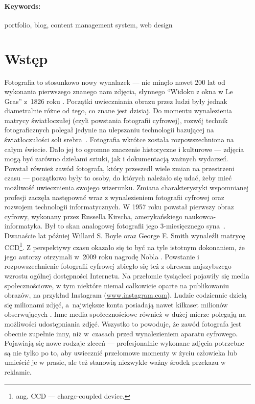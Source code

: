 \documentclass[a4paper, 12pt, twoside]{article}
\numberwithin{figure}{section}
\begin{document}
\begin{sloppypar}
\paragraph*{Keywords:}
portfolio, blog, content management system, web design

\newpage
\tableofcontents

\newpage


\section{Wstęp}

Fotografia to stosunkowo nowy wynalazek --- nie minęło nawet 200 lat od wykonania pierwszego znanego nam zdjęcia, słynnego ``Widoku z okna w Le Gras'' z~1826 roku \cite{fotografia}. Początki uwieczniania obrazu przez ludzi były jednak diametralnie różne od tego, co znane jest dzisiaj. Do momentu wynalezienia matrycy światłoczułej (czyli powstania fotografii cyfrowej), rozwój technik fotograficznych polegał jedynie na ulepszaniu technologii bazującej na światłoczułości soli srebra~\cite{fotografia}. Fotografia wkrótce została rozpowszechniona na całym świecie. Dało jej to ogromne znaczenie historyczne i kulturowe --- zdjęcia mogą być zarówno dziełami sztuki, jak i dokumentacją ważnych wydarzeń. Powstał również zawód fotografa, który przeszedł wiele zmian na przestrzeni czasu --- początkowo były to osoby, do których należało się udać, żeby mieć możliwość uwiecznienia swojego wizerunku. Zmiana charakterystyki wspomnianej profesji zaczęła następować wraz z wynalezieniem fotografii cyfrowej oraz rozwojem technologii informatycznych. W 1957 roku powstał pierwszy obraz cyfrowy, wykonany przez Russella Kirscha, amerykańskiego naukowca-informatyka. Był to skan analogowej fotografii jego 3-miesięcznego syna~\cite{firstdigitalphoto}. Dwanaście lat później Willard S. Boyle oraz George E. Smith wynaleźli matrycę CCD\footnote{ang. CCD --- charge-coupled device.}. Z perspektywy czasu okazało się to być na tyle istotnym dokonaniem, że jego autorzy otrzymali w~2009 roku nagrodę Nobla \cite{nobelfoto}. Powstanie i rozpowszechnienie fotografii cyfrowej zbiegło się też z okresem najszybszego wzrostu ogólnej dostępności Internetu. Na przełomie tysiącleci pojawiły się media społecznościowe, w tym niektóre niemal całkowicie oparte na publikowaniu obrazów, na przykład Instagram (\url{www.instagram.com}). Ludzie codziennie dzielą się milionami zdjęć, a~największe konta posiadają nawet kilkaset milionów obserwujących \cite{instagram}. Inne media społecznościowe również w dużej mierze polegają na możliwości udostępniania zdjęć. Wszystko to powoduje, że zawód fotografa jest obecnie zupełnie inny, niż w~czasach przed wynalezieniem aparatu cyfrowego. Pojawiają się nowe rodzaje zleceń --- profesjonalnie wykonane zdjęcia potrzebne są nie tylko po to, aby uwiecznić przełomowe momenty w życiu człowieka lub umieścić je w prasie, ale też stanowią niezwykle ważny środek przekazu w reklamie. 


\end{sloppypar}
\end{document}
